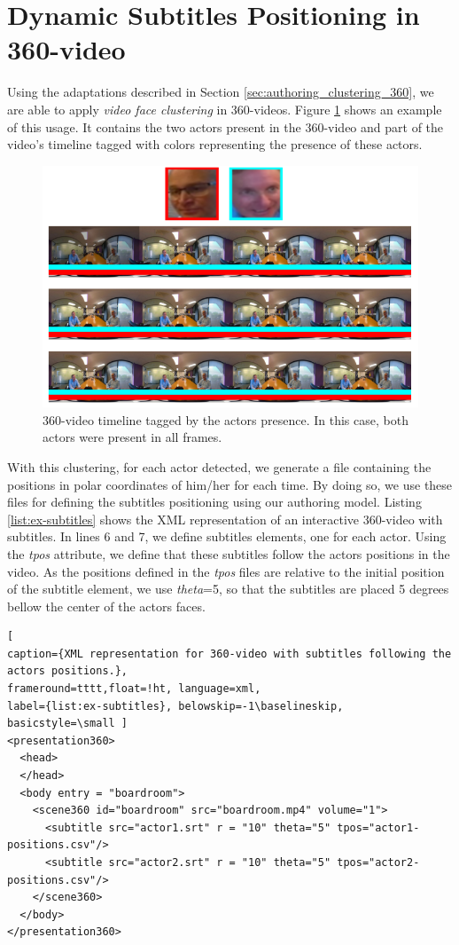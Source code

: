 \section{Dynamic Subtitles Positioning in 360-video}
\label{sec:authoring_discussion}

Using the adaptations described in Section \ref{sec:authoring_clustering_360}, we are able to apply \emph{video face clustering} in 360-videos. Figure \ref{fig:360_video_timeline} shows an example of this usage. It contains the two actors present in the 360-video and part of the video's timeline tagged with colors representing the presence of these actors.

\begin{figure}[!ht]
    \centering
    \includegraphics[width=0.85\linewidth]{img/video360/timeline-360.png}
    \caption{360-video timeline tagged by the actors presence. In this case, both actors were present in all frames.}
    \label{fig:360_video_timeline}
\end{figure}

With this clustering, for each actor detected, we generate a file containing the positions in polar coordinates of him/her for each time. By doing so, we use these files for defining the subtitles positioning using our authoring model. Listing \ref{list:ex-subtitles} shows the XML representation of an interactive 360-video with subtitles. In lines 6 and 7, we define subtitles elements, one for each actor. Using the \emph{tpos} attribute, we define that these subtitles follow the actors positions in the video. As the positions defined in the \emph{tpos} files are relative to the initial position of the subtitle element, we use \emph{theta}=5, so that the subtitles are placed 5 degrees bellow the center of the actors faces.


\begin{lstlisting}[
caption={XML representation for 360-video with subtitles following the actors positions.},
frameround=tttt,float=!ht, language=xml, 
label={list:ex-subtitles}, belowskip=-1\baselineskip, basicstyle=\small ]
<presentation360>
  <head>
  </head>
  <body entry = "boardroom">
    <scene360 id="boardroom" src="boardroom.mp4" volume="1">   
      <subtitle src="actor1.srt" r = "10" theta="5" tpos="actor1-positions.csv"/>      
      <subtitle src="actor2.srt" r = "10" theta="5" tpos="actor2-positions.csv"/>
    </scene360>
  </body>
</presentation360>
\end{lstlisting}

